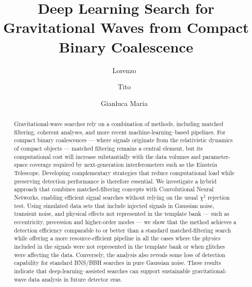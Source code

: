 \documentclass[aps,prd,twocolumn,superscriptaddress,nofootinbib, longbibliography]{revtex4-2}
\begin{document}
\title{Deep Learning Search for Gravitational Waves from Compact Binary Coalescence}


\author{Lorenzo \, }

\author{Tito \,}

\author{Gianluca Maria \, }

\begin{abstract}

Gravitational-wave searches rely on a combination of methods, including matched filtering, coherent analyses, and more recent machine-learning–based pipelines. For compact binary coalescences --- where signals originate from the relativistic dynamics of compact objects --- matched filtering remains a central element, but its computational cost will increase substantially with the data volumes and parameter-space coverage required by next-generation interferometers such as the Einstein Telescope. Developing complementary strategies that reduce computational load while preserving detection performance is therefore essential. We investigate a hybrid approach that combines matched-filtering concepts with Convolutional Neural Networks, enabling efficient signal searches without relying on the usual $\chi^2$ rejection test. Using simulated data sets that include injected signals in Gaussian noise, transient noise, and physical effects not represented in the template bank --- such as eccentricity, precession and higher-order modes --- we show that the method achieves a detection efficiency comparable to or better than a standard matched-filtering search while offering a more resource-efficient pipeline in all the cases where the physics included in the signals were not represented in the template bank or when glitches were affecting the data. Conversely, the analysis also reveals some loss of detection capability for standard BNS/BBH searches in pure Gaussian noise. These results indicate that deep-learning–assisted searches can support sustainable gravitational-wave data analysis in future detector eras.

\end{abstract}

\end{document}
